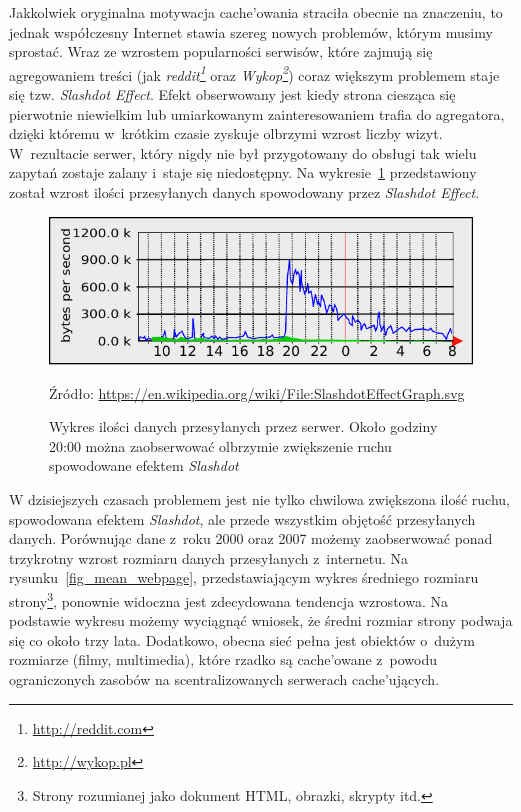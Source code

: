 \documentclass[a4paper,11pt]{scrartcl}
\newcommand{\figsource}[1]{
\captionsetup{font={scriptsize, it}}
\caption*{Źródło: \url{#1}}
\captionsetup{font={normalsize}}
}
\newcommand{\s}{ }
\newcommand{\keszujacych}{cache'ujących}
\newcommand{\keszowania}{cache'owania}
\newcommand{\keszowane}{cache'owane}
\begin{document}
Jakkolwiek oryginalna motywacja \keszowania\s straciła obecnie na znaczeniu, to jednak współczesny Internet stawia szereg nowych problemów, którym musimy sprostać. Wraz ze wzrostem popularności serwisów, które zajmują się agregowaniem treści (jak \textit{reddit\footnote{\url{http://reddit.com}}} oraz \textit{Wykop\footnote{\url{http://wykop.pl}}}) coraz większym problemem staje się tzw. \textit{Slashdot Effect}. Efekt obserwowany jest kiedy strona ciesząca się pierwotnie niewielkim lub umiarkowanym zainteresowaniem trafia do agregatora, dzięki któremu w~krótkim czasie zyskuje olbrzymi wzrost liczby wizyt. W~rezultacie serwer, który nigdy nie był przygotowany do obsługi tak wielu zapytań zostaje zalany i~staje się niedostępny. Na wykresie~\ref{fig_slashdot} przedstawiony został wzrost ilości przesyłanych danych spowodowany przez \textit{Slashdot Effect}.

\begin{figure}[h!]
\centering
\includegraphics[width=0.9\linewidth]{img/SlashdotEffectGraph.pdf}
\figsource{https://en.wikipedia.org/wiki/File:SlashdotEffectGraph.svg}
\caption{Wykres ilości danych przesyłanych przez serwer. Około godziny 20:00 można zaobserwować olbrzymie zwiększenie ruchu spowodowane efektem \textit{Slashdot}}
\label{fig_slashdot}
\end{figure}

W dzisiejszych czasach problemem jest nie tylko chwilowa zwiększona ilość ruchu, spowodowana efektem \textit{Slashdot}, ale przede wszystkim objętość przesyłanych danych. Porównując dane z~roku 2000 oraz 2007 możemy zaobserwować ponad trzykrotny wzrost rozmiaru danych przesyłanych z~internetu\cite{sadre2008changes}. Na rysunku~\ref{fig_mean_webpage}, przedstawiającym wykres średniego rozmiaru strony\footnote{Strony rozumianej jako dokument HTML, obrazki, skrypty itd.}, ponownie widoczna jest zdecydowana tendencja wzrostowa. Na podstawie wykresu możemy wyciągnąć wniosek, że średni rozmiar strony podwaja się co około trzy lata. Dodatkowo, obecna sieć pełna jest obiektów o~dużym rozmiarze (filmy, multimedia), które rzadko są \keszowane\s z~powodu ograniczonych zasobów na scentralizowanych serwerach \keszujacych\cite{sadre2008changes}.
\end{document}
